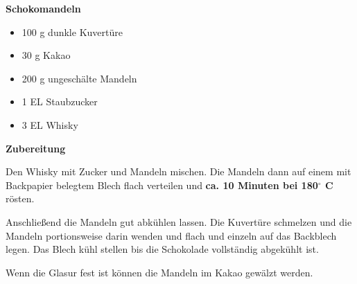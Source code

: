 

\parindent0pt	

\pagestyle{empty}


\textbf{{\LARGE Schokomandeln}}%

\hrulefill
\vspace*{\fill}
\begin{multicols}{2}	


\begin{itemize}
\item 100 g 	dunkle Kuvertüre
\item 30 g	Kakao
\item 200 g 	ungeschälte Mandeln	
\item 1 EL 	Staubzucker
\item 3 EL 	Whisky
\end{itemize}
\end{multicols}
\vfill									%

\vspace{2cm}
%



\vfill
\newpage
\textbf{{\LARGE Zubereitung}}%

\hrulefill

\vspace*{\fill}
\begin{multicols}{2}


Den Whisky mit Zucker und Mandeln mischen. Die Mandeln dann
auf einem mit Backpapier belegtem Blech flach verteilen und 
\textbf{ca. 10 Minuten bei 180$^\circ$ C} rösten.\newline

Anschließend die Mandeln gut abkühlen lassen.\newline
Die Kuvertüre schmelzen und die Mandeln portionsweise darin
wenden und flach und einzeln auf das Backblech legen.
Das Blech kühl stellen bis die Schokolade vollständig abgekühlt ist.\newline

Wenn die Glasur fest ist können die Mandeln im Kakao 
gewälzt werden.


\end{multicols}
\vfill
